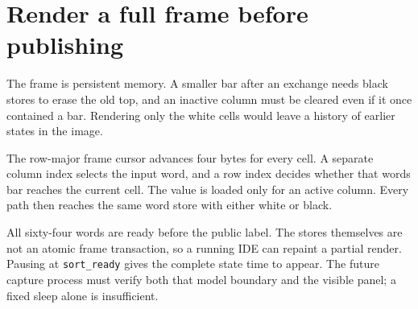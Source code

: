 \section{Render a full frame before
  publishing}\label{009-sorting-visualizer-p04-render-a-full-frame-before-publishing}

The frame is persistent memory. A smaller bar after an exchange needs
black stores to erase the old top, and an inactive column must be
cleared even if it once contained a bar. Rendering only the white cells
would leave a history of earlier states in the image.

The row-major frame cursor advances four bytes for every cell. A
separate column index selects the input word, and a row index decides
whether that word\textquotesingle s bar reaches the current cell. The
value is loaded only for an active column. Every path then reaches the
same word store with either white or black.

All sixty-four words are ready before the public label. The stores
themselves are not an atomic frame transaction, so a running IDE can
repaint a partial render. Pausing at \texttt{sort\_ready} gives the
complete state time to appear. The future capture process must verify
both that model boundary and the visible panel; a fixed sleep alone is
insufficient.
